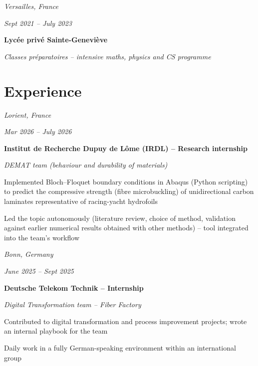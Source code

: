 \documentclass[10pt]{article}
\begin{document}
    \entrysep

    \begin{twocolentry}{
    \textit{Versailles, France}

    \textit{Sept 2021 – July 2023}}
        \textbf{Lycée privé Sainte-Geneviève}

        \textit{Classes préparatoires -- intensive maths, physics and CS programme}
    \end{twocolentry}


\section{Experience}

    \begin{twocolentry}{
    \textit{Lorient, France}

    \textit{Mar 2026 – July 2026}}
        \textbf{Institut de Recherche Dupuy de Lôme (IRDL) -- Research internship}

        \textit{DEMAT team (behaviour and durability of materials)}
    \end{twocolentry}

    \bulletsep
    \begin{onecolentry}
        \begin{highlights}
            \item Implemented Bloch--Floquet boundary conditions in Abaqus (Python scripting) to predict the compressive strength (fibre microbuckling) of unidirectional carbon laminates representative of racing-yacht hydrofoils
            \item Led the topic autonomously (literature review, choice of method, validation against earlier numerical results obtained with other methods) -- tool integrated into the team's workflow
        \end{highlights}
    \end{onecolentry}

    \entrysep

    \begin{twocolentry}{
    \textit{Bonn, Germany}

    \textit{June 2025 – Sept 2025}}
        \textbf{Deutsche Telekom Technik -- Internship}

        \textit{Digital Transformation team -- Fiber Factory}
    \end{twocolentry}

    \bulletsep
    \begin{onecolentry}
        \begin{highlights}
            \item Contributed to digital transformation and process improvement projects; wrote an internal playbook for the team
            \item Daily work in a fully German-speaking environment within an international group
        \end{highlights}
    \end{onecolentry}
\end{document}
